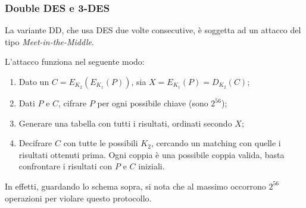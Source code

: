 \documentclass[a4paper, 10pt, twoside]{article}
\begin{document}
	\begin{center}
	\end{center}
	
	\subsubsection{Double DES e 3-DES}
	La variante DD, che usa DES due volte consecutive, è soggetta ad un attacco del tipo \textit{Meet-in-the-Middle}.
	\begin{center}
	\end{center}

	L'attacco funziona nel seguente modo: \begin{enumerate}
		\item Dato un $C = E_{K_2}(E_{K_1}(P))$, sia $X = E_{K_1}(P) = D_{K_2}(C)$;
		\item Dati $P$ e $C$, cifrare $P$ per ogni possibile chiave (sono $2^{56}$);
		\item Generare una tabella con tutti i risultati, ordinati secondo $X$;
		\item Decifrare $C$ con tutte le possibili $K_2$, cercando un matching con quelle i risultati ottenuti prima. Ogni coppia è una possibile coppia valida, basta confrontare i risultati con $P$ e $C$ iniziali.
	\end{enumerate}

	In effetti, guardando lo schema sopra, si nota che al massimo occorrono $2^{56}$ operazioni per violare questo protocollo.
	
\end{document}
